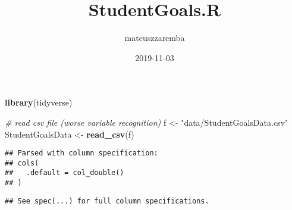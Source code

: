 \documentclass[]{article}
\title{StudentGoals.R}
\author{mateuszzaremba}
\date{2019-11-03}
\newenvironment{Shaded}{\begin{snugshade}}{\end{snugshade}}
\newcommand{\CommentTok}[1]{\textcolor[rgb]{0.56,0.35,0.01}{\textit{#1}}}
\newcommand{\KeywordTok}[1]{\textcolor[rgb]{0.13,0.29,0.53}{\textbf{#1}}}
\newcommand{\NormalTok}[1]{#1}
\newcommand{\StringTok}[1]{\textcolor[rgb]{0.31,0.60,0.02}{#1}}
\begin{document}
\maketitle

\begin{Shaded}
\begin{Highlighting}[]
\KeywordTok{library}\NormalTok{(tidyverse)}

\CommentTok{# read csv file (worse variable recognition)}
\NormalTok{f <-}\StringTok{ "data/StudentGoalsData.csv"}
\NormalTok{StudentGoalsData <-}\StringTok{ }\KeywordTok{read_csv}\NormalTok{(f)}
\end{Highlighting}
\end{Shaded}

\begin{verbatim}
## Parsed with column specification:
## cols(
##   .default = col_double()
## )
\end{verbatim}

\begin{verbatim}
## See spec(...) for full column specifications.
\end{verbatim}
\end{document}
